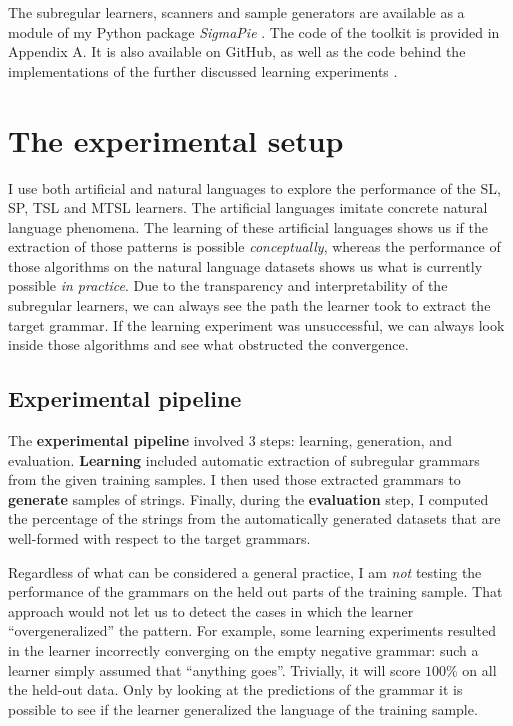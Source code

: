 The subregular learners, scanners and sample generators are available as a module of my Python package \emph{SigmaPie} \href{https://pypi.org/project/SigmaPie/}{\faCube} \citep{sigmapie}.
The code of the toolkit is provided in Appendix A.
It is also available on GitHub, as well as the code behind the implementations of the further discussed learning experiments \href{https://github.com/alenaks/subregular-experiments}{\faGithub} \citep{GHsubex}.


\section{The experimental setup}

I use both artificial and natural languages to explore the performance of the SL, SP, TSL and MTSL learners.
The artificial languages imitate concrete natural language phenomena.
The learning of these artificial languages shows us if the extraction of those patterns is possible \emph{conceptually}, whereas the performance of those algorithms on the natural language datasets shows us what is currently possible \emph{in practice}.
Due to the transparency and interpretability of the subregular learners, we can always see the path the learner took to extract the target grammar.
If the learning experiment was unsuccessful, we can always look inside those algorithms and see what obstructed the convergence.

\subsection{Experimental pipeline}

The \textbf{experimental pipeline} involved $3$ steps: learning, generation, and evaluation.
\textbf{Learning} included automatic extraction of subregular grammars from the given training samples.
I then used those extracted grammars to \textbf{generate} samples of strings.
Finally, during the \textbf{evaluation} step, I computed the percentage of the strings from the automatically generated datasets that are well-formed with respect to the target grammars.

Regardless of what can be considered a general practice, I am \emph{not} testing the performance of the grammars on the held out parts of the training sample.
That approach would not let us to detect the cases in which the learner ``overgeneralized'' the pattern.
For example, some learning experiments resulted in the learner incorrectly converging on the empty negative grammar: such a learner simply assumed that ``anything goes''.
Trivially, it will score $100$\% on all the held-out data.
Only by looking at the predictions of the grammar it is possible to see if the learner generalized the language of the training sample.

